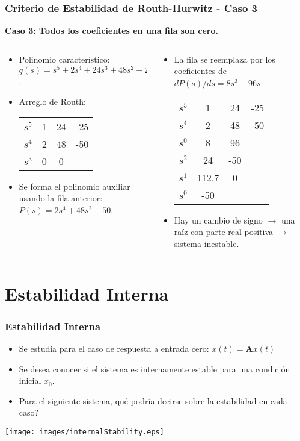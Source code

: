 \documentclass[aspectratio=169,handout]{beamer}
\theoremstyle{definition}
\theoremstyle{plain}
\theoremstyle{remark}
\begin{document}
\begin{frame}[<+->]\frametitle{Criterio de Estabilidad de Routh-Hurwitz - Caso 3}
\textbf{Caso 3: Todos los coeficientes en una fila son cero.}
\begin{columns}
\begin{column}{0.5\textwidth}
	\begin{itemize}
		\item Polinomio característico: $q(s) = s^5 + 2s^4 + 24s^3 + 48s^2 - 25s - 50 = 0$.
		\item Arreglo de Routh:\\
		\centering	
		\begin{tabular}{c|ccc}
			$s^5$ & 1 & 24 & -25\\
			$s^4$ & 2 & 48 & -50\\
			$s^3$ & 0 & 0  & 
		\end{tabular}
		\item Se forma el polinomio auxiliar usando la fila anterior: $P(s) = 2s^4 + 48s^2 - 50$.
	\end{itemize}	
\end{column}	
\begin{column}{0.5\textwidth}
	\begin{itemize}
		\item La fila se reemplaza por los coeficientes de $dP(s)/ds = 8s^3 + 96s$:
		\centering	
		\begin{tabular}{c|ccc}
			$s^5$ & 1  &  24 & -25\\
			$s^4$ & 2  &  48 & -50\\
			$s^0$ & 8  &  96 & \\
			$s^2$ & 24 & -50 & \\
			$s^1$ & 112.7 & 0 & \\
			$s^0$ & -50 &  & 
		\end{tabular}
		\item Hay un cambio de signo $\rightarrow$ una raíz con parte real positiva $\rightarrow$ sistema inestable.
	\end{itemize}
\end{column}	
\end{columns}
\end{frame}

\section{Estabilidad Interna}
\begin{frame}[<+->]\frametitle{Estabilidad Interna}
\begin{itemize}
  \item Se estudia para el caso de respuesta a entrada cero: $\dot{x}(t) = \mathbf{A}x(t)$
  \item Se desea conocer si el sistema es internamente estable para una condición inicial $x_0$.
  \item Para el siguiente sistema, qué podría decirse sobre la estabilidad en cada caso?
\end{itemize}
	\centering
	\texttt{[image: images/internalStability.eps]}
\end{frame}
\end{document}
